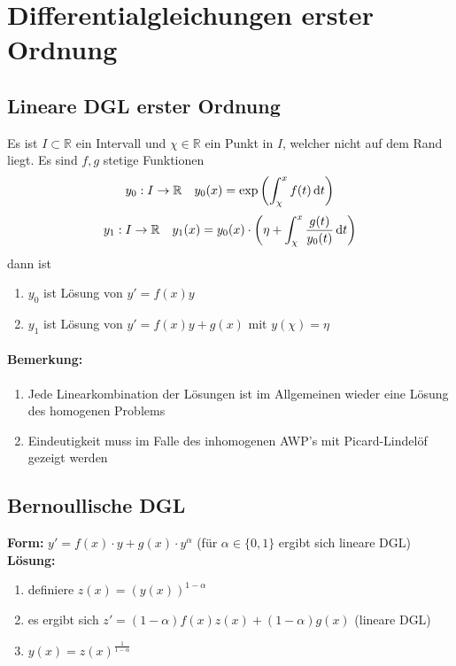 \section{Differentialgleichungen erster Ordnung}

\subsection{Lineare DGL erster Ordnung}
Es ist $I\subset\mathbb{R}$ ein Intervall und $\chi\in\mathbb{R}$ ein Punkt in $I$, welcher nicht auf dem Rand liegt. Es sind $f,g$ stetige Funktionen
\begin{equation*}
    y_0:I\to\mathbb{R} \quad y_0(x)=\exp\left(\int_\chi^xf(t)\mathop{}\!\mathrm{d} t\right)
\end{equation*}
\begin{equation*}
    y_1:I\to\mathbb{R} \quad y_1(x)=y_0(x)\cdot\left(\eta+\int_\chi^x\frac{g(t)}{y_0(t)}\mathop{}\!\mathrm{d} t\right)
\end{equation*}
dann ist
\begin{enumerate}
    \item $y_0$ ist Lösung von $y'=f(x)y$
    \item $y_1$ ist Lösung von $y'=f(x)y+g(x)$ mit $y(\chi)=\eta$
\end{enumerate}
\paragraph{Bemerkung:}
\begin{enumerate}
    \item Jede Linearkombination der Lösungen ist im Allgemeinen wieder eine Lösung des homogenen Problems
    \item Eindeutigkeit muss im Falle des inhomogenen AWP's mit Picard-Lindelöf gezeigt werden
\end{enumerate}

\subsection{Bernoullische DGL}
\textbf{Form:} $y' = f(x)\cdot y + g(x)\cdot y^{\alpha}$ (für $\alpha \in \{0, 
1\}$ ergibt sich lineare DGL)\\
\textbf{Lösung:} 
\begin{enumerate}
    \item definiere $z(x) = (y(x))^{1-\alpha}$
    \item es ergibt sich $z' = (1-\alpha)f(x)z(x) + (1-\alpha)g(x)$ (lineare DGL)
    \item $y(x) = z(x)^{\frac{1}{1-\alpha}}$
\end{enumerate}


